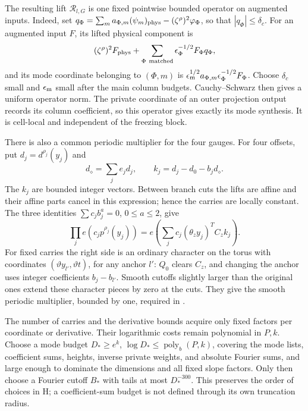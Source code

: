 The resulting lift \(\mathcal R_{l,G}\) is one fixed pointwise bounded
operator on augmented inputs.  Indeed, set
\(q_\Phi=\sum_m a_{\Phi,m}(\psi_m)_{\rm phys}
               -(\zeta^\rho)^2\varphi_\Phi\), so that
\(|q_\Phi|\le\delta_c\).  For an augmented input \(F\), its lifted
physical component is
\[
 (\zeta^\rho)^2F_{\rm phys}
       +\sum_{\Phi\ \text{matched}}
             \epsilon_\Phi^{-1/2}F_\Phi q_\Phi,
\]
and its mode coordinate belonging to \((\Phi,m)\) is
\(\epsilon_{\rm m}^{1/2}a_{\Phi,m}
\epsilon_\Phi^{-1/2}F_\Phi\).
Choose \(\delta_c\) small and \(\epsilon_{\rm m}\) small after the
main column budgets.  Cauchy--Schwarz then gives a uniform operator
norm.  The private coordinate of an outer projection output records
its column coefficient, so this operator gives exactly its mode
synthesis.  It is cell-local and independent of the freezing block.

There is also a common periodic multiplier for the four gauges.
For four offsets, put \(d_j=d^{\rho_j}(y_j)\) and
\[
 d_\diamond=\sum_j e_jd_j,\qquad
 k_j=d_j-d_0-b_jd_\diamond.
\]
The \(k_j\) are bounded integer vectors.  Between branch cuts the
lifts are affine and their affine parts cancel in this expression;
hence the carries are locally constant.  The three identities
\(\sum c_jb_j^a=0\), \(0\le a\le2\), give
\begin{equation}\label{eq:gauge-multiplier-b}
 \prod_j e(c_jp^{\rho_j}(y_j))
   =e\left(\sum_jc_j(\theta_zy_j)^TC_zk_j\right).
\end{equation}
For fixed carries the right side is an ordinary character on the
torus with coordinates \((\vartheta y_{l'},\vartheta t)\), for any
anchor \(l'\): \(Q_0\) clears \(C_z\), and changing the anchor uses
integer coefficients \(b_j-b_{l'}\).  Smooth cutoffs slightly larger
than the original ones extend these character pieces by zero at the
cuts.  They give the smooth periodic multiplier, bounded by one,
required in \cite[Section~8.3]{H}.

The number of carries and the derivative bounds acquire only fixed
factors per coordinate or derivative.  Their logarithmic costs remain
polynomial in \(P,k\).  Choose a mode budget \(D_*\ge e^k\),
\(\log D_*\le\operatorname{poly}_b(P,k)\), covering the mode lists,
coefficient sums, heights, inverse private weights, and absolute
Fourier sums, and large enough to dominate the dimensions and all
fixed slope factors.  Only then choose a Fourier cutoff \(B_*\) with
tails at most \(D_*^{-300}\).  This preserves the order of choices
in H; a coefficient-sum budget is not defined through its own
truncation radius.

